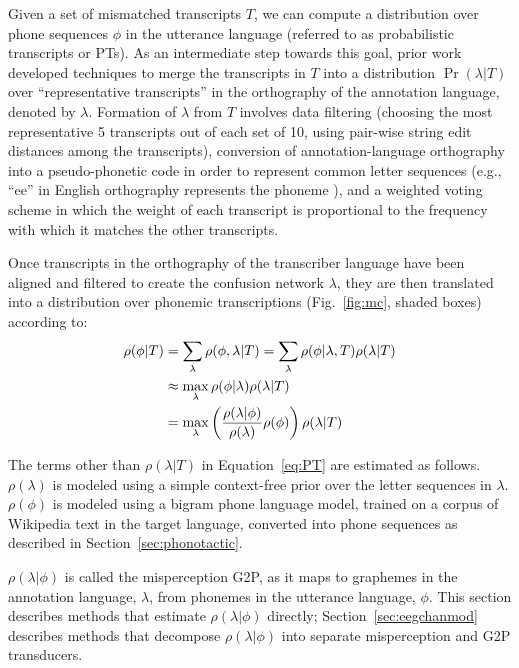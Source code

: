 Given a set of mismatched transcripts $T$, we can compute a distribution 
over phone sequences $\phi$ in the utterance language (referred to as
probabilistic transcripts or PTs).  
As an intermediate step towards this goal, prior
work~\cite{JHJ15b} developed techniques to merge the transcripts
in $T$ into a distribution $\Pr(\lambda|T)$ over ``representative
transcripts'' in the orthography of the annotation language, denoted
by $\lambda$. Formation of $\lambda$ from $T$ involves data filtering
(choosing the most representative 5 transcripts out of each set of 10,
using pair-wise string edit distances among the transcripts),
conversion of annotation-language orthography into a pseudo-phonetic
code in order to represent common letter sequences (e.g., ``ee'' in
English orthography represents the phoneme ), and a weighted
voting scheme in which the weight of each transcript is proportional
to the frequency with which it matches the other transcripts.

Once transcripts in the orthography of the transcriber language have been
aligned and filtered to create the confusion network $\lambda$, they
are then translated into a distribution over phonemic transcriptions
(Fig.~\ref{fig:mc}, shaded boxes) according to:
\begin{align}
  \rho(\phi|T) &=
  \sum_{\lambda} \rho(\phi, \lambda|T) =
  \sum_{\lambda} \rho(\phi|\lambda,T) \rho(\lambda|T) \notag \\
  &\approx \max_{\lambda}  \rho(\phi|\lambda) \rho(\lambda|T) \notag \\
  &= \max_{\lambda}  \left(\frac{\rho(\lambda|\phi)}{\rho(\lambda)}
  \rho(\phi)\right) \rho(\lambda|T) 
\label{eq:PT}
\end{align}

The terms other than $\rho(\lambda|T)$ in Equation~\ref{eq:PT} are
estimated as follows.  $\rho(\lambda)$ is modeled using a simple
context-free prior over the letter sequences in $\lambda$.
$\rho(\phi)$ is modeled using a bigram phone language model, trained
on a corpus of Wikipedia text in the target language, converted into
phone sequences as described in Section~\ref{sec:phonotactic}.

$\rho(\lambda|\phi)$ is called the misperception G2P, as it maps to
graphemes in the annotation language, $\lambda$, from phonemes in the
utterance language, $\phi$.  This section describes methods that 
estimate $\rho(\lambda|\phi)$ directly; Section~\ref{sec:eegchanmod} 
describes methods that decompose $\rho(\lambda|\phi)$ 
into separate misperception and G2P transducers.

